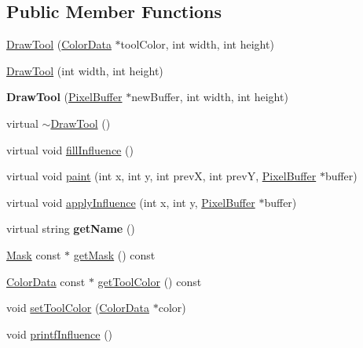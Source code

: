 \subsection*{Public Member Functions}
\begin{DoxyCompactItemize}
\item 
\hyperlink{classDrawTool_aa21e3a5373ba9e4e43d6e56eec82b32d}{Draw\+Tool} (\hyperlink{classColorData}{Color\+Data} $\ast$tool\+Color, int width, int height)
\item 
\hyperlink{classDrawTool_aa1816d6699a835d9c7619ee5c97be9d1}{Draw\+Tool} (int width, int height)
\item 
{\bfseries Draw\+Tool} (\hyperlink{classPixelBuffer}{Pixel\+Buffer} $\ast$new\+Buffer, int width, int height)\hypertarget{classDrawTool_a521ad2f183dd3354de1dd163140e8b1d}{}\label{classDrawTool_a521ad2f183dd3354de1dd163140e8b1d}

\item 
virtual \hyperlink{classDrawTool_ac07eb21dc6dfc99b7e3e7a6e3b9548f3}{$\sim$\+Draw\+Tool} ()
\item 
virtual void \hyperlink{classDrawTool_ae202bc193ba721452e81f34b6c2e6e35}{fill\+Influence} ()
\item 
virtual void \hyperlink{classDrawTool_a65dbb2f006efc9c6053d01df75eff5a9}{paint} (int x, int y, int prevX, int prevY, \hyperlink{classPixelBuffer}{Pixel\+Buffer} $\ast$buffer)
\item 
virtual void \hyperlink{classDrawTool_ac60a70d91e81163d413b99382ac4255b}{apply\+Influence} (int x, int y, \hyperlink{classPixelBuffer}{Pixel\+Buffer} $\ast$buffer)
\item 
virtual string {\bfseries get\+Name} ()\hypertarget{classDrawTool_a11a450d969098c86158b6ec5f14d291e}{}\label{classDrawTool_a11a450d969098c86158b6ec5f14d291e}

\item 
\hyperlink{classMask}{Mask} const $\ast$ \hyperlink{classDrawTool_ad11d4e44fcd2caf774e18ce5b2986865}{get\+Mask} () const 
\item 
\hyperlink{classColorData}{Color\+Data} const $\ast$ \hyperlink{classDrawTool_a00485271784acd5acc75840a7a17eb2e}{get\+Tool\+Color} () const 
\item 
void \hyperlink{classDrawTool_a7f7097be5f6beb7b3f6ce437785cac7a}{set\+Tool\+Color} (\hyperlink{classColorData}{Color\+Data} $\ast$color)
\item 
void \hyperlink{classDrawTool_a04f57381cb6c71d90a66e905b46f424c}{printf\+Influence} ()
\end{DoxyCompactItemize}
